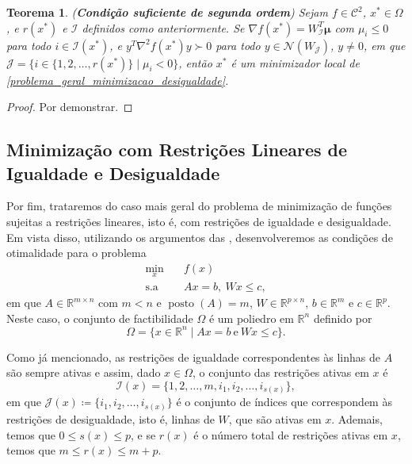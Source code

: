 \documentclass[12pt,a4paper]{scrartcl}
\DeclareMathOperator{\posto}{posto}
\def\RR{\mathds{R}}
\newtheorem{teo}{Teorema}
\theoremstyle{definition}%
\begin{document}
\begin{teo}(\textbf{Condição suficiente de segunda ordem}) \label{teo:condicao_suficiente_2ordem_desigualdade}
Sejam $f \in \mathcal{C}^{2}$, $x^{*} \in \Omega$, e $r(x^{*})$ e $\mathcal{I}$ definidos como anteriormente. Se $\nabla f(x^{*}) = W_{\mathcal{I}}^{T} \boldsymbol{\mu}$ com $\mu_{i} \leq 0$ para todo $i \in \mathcal{I}(x^{*})$, e $y^{T} \nabla^{2} f(x^{*})y \succ 0$ para todo $y \in \mathcal{N}(W_{\mathcal{J}})$, $y\neq 0$, em que $\mathcal{J} = \{ i\in \{ 1,2, \ldots , r(x^{*}) \} \mid \mu_{i} <0 \}$, então $x^{*}$ é um minimizador local de \eqref{problema_geral_minimizacao_desigualdade}.
\end{teo}
\begin{proof}
Por demonstrar.
\end{proof}




\subsection{Minimização com Restrições Lineares de Igualdade e Desigualdade}

Por fim, trataremos do caso mais geral do problema de minimização de funções sujeitas a restrições lineares, isto é, com restrições de igualdade e desigualdade. Em vista disso, utilizando os argumentos das , desenvolveremos as condições de otimalidade para o problema
\[ \label{problema_geral_minimizacao_igualdade_desigualdade}
\begin{aligned}
\min_{x} & \quad f(x) \\
\text{s.a} & \quad Ax = b, \ Wx \leq c,
\end{aligned}
\]
em que $A\in \RR^{m\times n}$ com $m<n$ e $\posto (A) = m$, $W\in \RR^{p\times n}$, $b\in \RR^{m}$ e $c\in \RR^{p}$. Neste caso, o conjunto de factibilidade $\Omega$ é um poliedro em $\RR^{n}$ definido por 
\[
\Omega = \{ x\in \RR^{n} \mid Ax =b \ \text{e} \ Wx \leq c \}.
\]

Como já mencionado, as restrições de igualdade correspondentes às linhas de $A$ são sempre ativas e assim, dado $x\in \Omega$, o conjunto das restrições ativas em $x$ é
\[
\mathcal{I}(x) = \{ 1,2, \ldots ,m,i_{1} , i_{2} , \ldots , i_{s(x)} \} ,
\]
em que $\mathcal{J}(x) \coloneqq \{ i_{1} , i_{2} , \ldots , i_{s(x)} \}$ é o conjunto de índices que correspondem às restrições de desigualdade, isto é, linhas de $W$, que são ativas em $x$. Ademais, temos que $0\leq s(x) \leq p$, e se $r(x)$ é o número total de restrições ativas em $x$, temos que $m \leq r(x) \leq m+p$.
\end{document}
